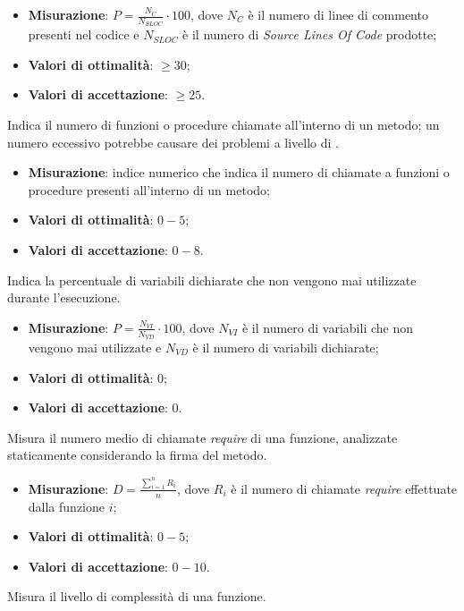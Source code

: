 \begin{itemize}
\item \textbf{Misurazione}: $P=\frac{N_{C}}{N_{SLOC}} \cdot 100$, dove $N_{C}$ è il numero di linee di commento presenti nel codice e $N_{SLOC}$ è il numero di \textit{Source Lines Of Code} prodotte;
\item \textbf{Valori di ottimalità}: $\geq 30$;
\item \textbf{Valori di accettazione}: $\geq 25$.
\end{itemize}
Indica il numero di funzioni o procedure chiamate all'interno di un metodo; un numero eccessivo potrebbe causare dei problemi a livello di .
\begin{itemize}
\item \textbf{Misurazione}: indice numerico che indica il numero di chiamate a funzioni o procedure presenti all'interno di un metodo;
\item \textbf{Valori di ottimalità}: $0 - 5$;
\item \textbf{Valori di accettazione}: $0 - 8$.
\end{itemize}
\label{variabInutilizz}
Indica la percentuale di variabili dichiarate che non vengono mai utilizzate durante l'esecuzione.
\begin{itemize}
\item \textbf{Misurazione}: $P = \frac{N_{VI}}{N_{VD}} \cdot 100$, dove $N_{VI}$ è il numero di variabili che non vengono mai utilizzate e $N_{VD}$ è il numero di variabili dichiarate;
\item \textbf{Valori di ottimalità}: $0$;
\item \textbf{Valori di accettazione}: $0$.
\end{itemize}
\label{dipendenze}
Misura il numero medio di chiamate \textit{require} di una funzione, analizzate staticamente considerando la firma del metodo.
\begin{itemize}
\item \textbf{Misurazione}: $D = \frac{\sum_{i=1}^{n} R_{i}}{n}$, dove $R_{i}$ è il numero di chiamate \textit{require} effettuate dalla funzione $i$;
\item \textbf{Valori di ottimalità}: $0 - 5$;
\item \textbf{Valori di accettazione}: $0 - 10$.
\end{itemize}
\label{halDiff}
Misura il livello di complessità di una funzione.
